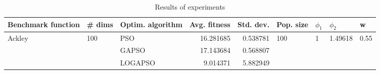 \begin{table}
\centering
\caption{Results of experiments}
\begin{tabular}{lllrrllll}
\toprule
     Benchmark function &              \# dims & Optim. algorithm &  Avg. fitness &  Std. dev. &            Pop. size &         $\phi_{1}$ &               $\phi_{2}$ &                     w \\
\midrule
\multirow{3}{*}{Ackley} & \multirow{3}{*}{100} &              PSO &     16.281685 &   0.538781 & \multirow{3}{*}{100} & \multirow{3}{*}{1} & \multirow{3}{*}{1.49618} & \multirow{3}{*}{0.55} \\
                        &                      &            GAPSO &     17.143684 &   0.568807 &                      &                    &                          &                       \\
                        &                      &          LOGAPSO &      9.014371 &   5.882949 &                      &                    &                          &                       \\
\bottomrule
\end{tabular}
\end{table}
